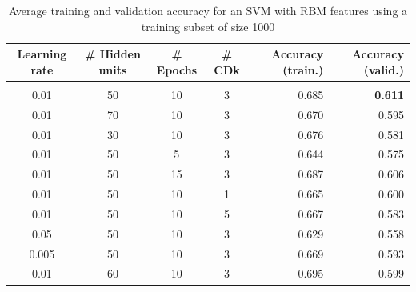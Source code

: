 \documentclass{article} %
\begin{document}
\begin{table}[h]
\caption{Average training and validation accuracy for an SVM with RBM features
 using a training subset of size 1000}
\label{results-table}
\begin{center}
\begin{adjustbox}{width=1\textwidth}
\begin{tabular}{cccc|rr}

\multicolumn{1}{c}{\bf Learning rate}  
&\multicolumn{1}{c}{\bf \# Hidden units}  
&\multicolumn{1}{c}{\bf \# Epochs} 
&\multicolumn{1}{c}{\bf \# CDk} 
&\multicolumn{1}{|r}{\bf Accuracy (train.)}
&\multicolumn{1}{r}{\bf Accuracy (valid.)}
\\ \hline \\	
0.01 & 50 & 10 & 3 & 0.685 & \textbf{0.611} \\
0.01 & 70 & 10 & 3 & 0.670 & 0.595 \\
0.01 & 30 & 10 & 3 & 0.676 & 0.581 \\
0.01 & 50 & 5 & 3 & 0.644 & 0.575 \\
0.01 & 50 & 15 & 3 & 0.687 & 0.606 \\
0.01 & 50 & 10 & 1 & 0.665 & 0.600 \\
0.01 & 50 & 10 & 5 & 0.667 & 0.583 \\
0.05 & 50 & 10 & 3 & 0.629 & 0.558 \\
0.005 & 50 & 10 & 3 & 0.669 & 0.593 \\
0.01 & 60 & 10 & 3 & 0.695 & 0.599 \\

\end{tabular}
\end{adjustbox}
\end{center}
\end{table}
\end{document}
